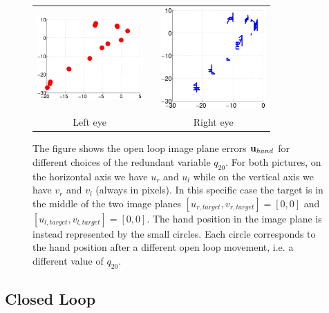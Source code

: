 \begin{figure}
  \begin{center}
	\begin{tabular}{ccc}
	  \parbox{40mm}{\includegraphics[width=40mm]{Figure/LeftEyeOpenLoop.eps}}  & \hspace{2cm} &
	  \parbox{40mm}{\includegraphics[width=40mm]{Figure/RightEyeOpenLoop.eps}}
	  \\
	  \parbox{40mm}{\centering Left eye } & \hspace{2cm} & \parbox{40mm}{\centering Right eye }
  \end{tabular}
\end{center}
\caption{The figure shows the open loop image plane errors $\mathbf{u}_{hand}$ for different
choices of the redundant variable $q_{20}$. For both pictures, on the horizontal axis 
we have $u_r$ and $u_l$ while on the vertical axis we have $v_r$ and $v_l$ (always in pixels).
In this specific case the target is in the middle of the two image planes 
$[u_{r, target}, v_{r, target}] =[0,0]$ and $[u_{l, target}, v_{l, target}]=[0,0]$.
The hand position in the image plane is instead represented 
by the small circles.  Each circle corresponds to the hand position 
after a different open loop movement, i.e. a different value of $q_{20}$.
}\label{Fig:ImagePlaneOpenLoopErrors}
  \end{figure}

\subsection{Closed Loop} \label{Sec:ResultsClosedLoop}

